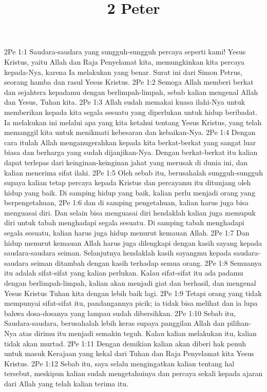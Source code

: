 

\title{2 Peter}

2Pe 1:1  Saudara-saudara yang sungguh-sungguh percaya seperti kami! Yesus Kristus, yaitu Allah dan Raja Penyelamat kita, memungkinkan kita percaya kepada-Nya, karena Ia melakukan yang benar. Surat ini dari Simon Petrus, seorang hamba dan rasul Yesus Kristus.
2Pe 1:2  Semoga Allah memberi berkat dan sejahtera kepadamu dengan berlimpah-limpah, sebab kalian mengenal Allah dan Yesus, Tuhan kita.
2Pe 1:3  Allah sudah memakai kuasa ilahi-Nya untuk memberikan kepada kita segala sesuatu yang diperlukan untuk hidup beribadat. Ia melakukan ini melalui apa yang kita ketahui tentang Yesus Kristus, yang telah memanggil kita untuk menikmati kebesaran dan kebaikan-Nya.
2Pe 1:4  Dengan cara itulah Allah menganugerahkan kepada kita berkat-berkat yang sangat luar biasa dan berharga yang sudah dijanjikan-Nya. Dengan berkat-berkat itu kalian dapat terlepas dari keinginan-keinginan jahat yang merusak di dunia ini, dan kalian menerima sifat ilahi.
2Pe 1:5  Oleh sebab itu, berusahalah sungguh-sungguh supaya kalian tetap percaya kepada Kristus dan percayamu itu ditunjang oleh hidup yang baik. Di samping hidup yang baik, kalian perlu menjadi orang yang berpengetahuan,
2Pe 1:6  dan di samping pengetahuan, kalian harus juga bisa menguasai diri. Dan selain bisa menguasai diri hendaklah kalian juga memupuk diri untuk tabah menghadapi segala sesuatu. Di samping tabah menghadapi segala sesuatu, kalian harus juga hidup menurut kemauan Allah.
2Pe 1:7  Dan hidup menurut kemauan Allah harus juga dilengkapi dengan kasih sayang kepada saudara-saudara seiman. Selanjutnya hendaklah kasih sayangmu kepada saudara-saudara seiman ditambah dengan kasih terhadap semua orang.
2Pe 1:8  Semuanya itu adalah sifat-sifat yang kalian perlukan. Kalau sifat-sifat itu ada padamu dengan berlimpah-limpah, kalian akan menjadi giat dan berhasil, dan mengenal Yesus Kristus Tuhan kita dengan lebih baik lagi.
2Pe 1:9  Tetapi orang yang tidak mempunyai sifat-sifat itu, pandangannya picik; ia tidak bisa melihat dan ia lupa bahwa dosa-dosanya yang lampau sudah dibersihkan.
2Pe 1:10  Sebab itu, Saudara-saudara, berusahalah lebih keras supaya panggilan Allah dan pilihan-Nya atas dirimu itu menjadi semakin teguh. Kalau kalian melakukan itu, kalian tidak akan murtad.
2Pe 1:11  Dengan demikian kalian akan diberi hak penuh untuk masuk Kerajaan yang kekal dari Tuhan dan Raja Penyelamat kita Yesus Kristus.
2Pe 1:12  Sebab itu, saya selalu mengingatkan kalian tentang hal tersebut, meskipun kalian sudah mengetahuinya dan percaya sekali kepada ajaran dari Allah yang telah kalian terima itu.
